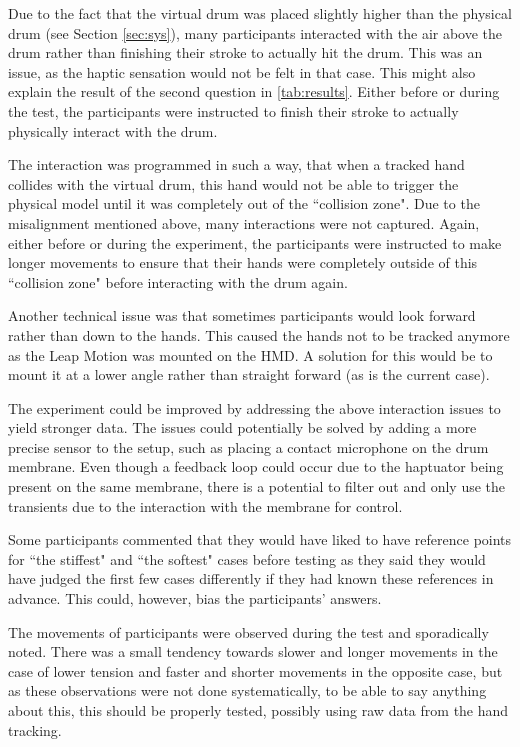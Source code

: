 \documentclass{article}
\begin{document}
Due to the fact that the virtual drum was placed slightly higher than the physical drum (see Section \ref{sec:sys}), many participants interacted with the air above the drum rather than finishing their stroke to actually hit the drum. This was an issue, as the haptic sensation would not be felt in that case. This might also explain the result of the second question in \autoref{tab:results}. Either before or during the test, the participants were instructed to finish their stroke to actually physically interact with the drum. 

The interaction was programmed in such a way, that when a tracked hand collides with the virtual drum, this hand would not be able to trigger the physical model until it was completely out of the ``collision zone". Due to the misalignment mentioned above, many interactions were not captured. Again, either before or during the experiment, the participants were instructed to make longer movements to ensure that their hands were completely outside of this ``collision zone" before interacting with the drum again.

Another technical issue was that sometimes participants would look forward rather than down to the hands. This caused the hands not to be tracked anymore as the Leap Motion was mounted on the HMD. A solution for this would be to mount it at a lower angle rather than straight forward (as is the current case).

The experiment could be improved by addressing the above interaction issues to yield stronger data. The issues could potentially be solved by adding a more precise sensor to the setup, such as placing a contact microphone on the drum membrane. Even though a feedback loop could occur due to the haptuator being present on the same membrane, there is a potential to filter out and only use the transients due to the interaction with the membrane for control.

Some participants commented that they would have liked to have reference points for ``the stiffest" and ``the softest" cases before testing as they said they would have judged the first few cases differently if they had known these references in advance. This could, however, bias the participants' answers.

The movements of participants were observed during the test and sporadically noted. There was a small tendency towards slower and longer movements in the case of lower tension and faster and shorter movements in the opposite case, but as these observations were not done systematically, to be able to say anything about this, this should be properly tested, possibly using raw data from the hand tracking.
\end{document}
